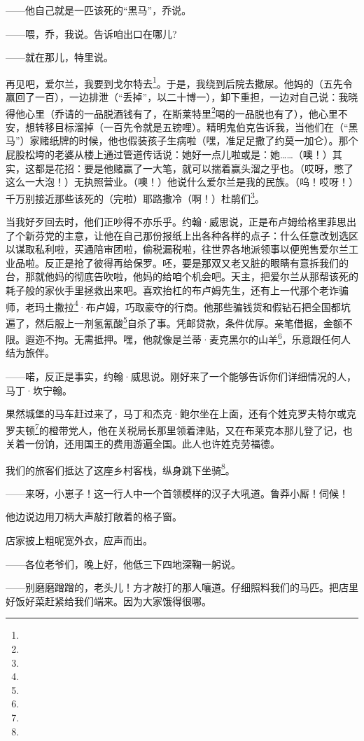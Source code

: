 \par ——他自己就是一匹该死的“黑马”，乔说。
\par ——喂，乔，我说。告诉咱出口在哪儿?
\par ——就在那儿，特里说。
\par 再见吧，爱尔兰，我要到戈尔特去\footnote{}。于是，我绕到后院去撒尿。他妈的（五先令赢回了一百），一边排泄（“丢掉”，以二十博一），卸下重担，一边对自己说：我晓得他心里（乔请的一品脱酒钱有了，在斯莱特里\footnote{}喝的一品脱也有了），他心里不安，想转移目标溜掉（一百先令就是五镑哩）。精明鬼伯克告诉我，当他们在（“黑马”）家赌纸牌的时候，他也假装孩子生病啦（嘿，准足足撒了约莫一加仑）。那个屁股松垮的老婆从楼上通过管道传话说：她好一点儿啦或是：她……（噢！）其实，这都是花招：要是他赌赢了一大笔，就可以揣着赢头溜之乎也。（哎呀，憋了这么一大泡！）无执照营业。（噢！）他说什么爱尔兰是我的民族。（呜！哎呀！）千万别接近那些该死的（完啦）耶路撒冷（啊！）杜鹃们\footnote{}。
\par 当我好歹回去时，他们正吵得不亦乐乎。约翰·威思说，正是布卢姆给格里菲思出了个新芬党的主意，让他在自己那份报纸上出各种各样的点子：什么任意改划选区以谋取私利啦，买通陪审团啦，偷税漏税啦，往世界各地派领事以便兜售爱尔兰工业品啦。反正是抢了彼得再给保罗。呸，要是那双又老又脏的眼睛有意拆我们的台，那就他妈的彻底告吹啦，他妈的给咱个机会吧。天主，把爱尔兰从那帮该死的耗子般的家伙手里拯救出来吧。喜欢抬杠的布卢姆先生，还有上一代那个老诈骗师，老玛土撒拉\footnote{}·布卢姆，巧取豪夺的行商。他那些骗钱货和假钻石把全国都坑遍了，然后服上一剂氢氰酸\footnote{}自杀了事。凭邮贷款，条件优厚。亲笔借据，金额不限。遐迩不拘。无需抵押。嘿，他就像是兰蒂·麦克黑尔的山羊\footnote{}，乐意跟任何人结为旅伴。
\par ——喏，反正是事实，约翰·威思说。刚好来了一个能够告诉你们详细情况的人，马丁·坎宁翰。
\par 果然城堡的马车赶过来了，马丁和杰克·鲍尔坐在上面，还有个姓克罗夫特尔或克罗夫顿\footnote{}的橙带党人，他在关税局长那里领着津贴，又在布莱克本那儿登了记，也关着一份饷，还用国王的费用游遍全国。此人也许姓克劳福德。
\par 我们的旅客们抵达了这座乡村客栈，纵身跳下坐骑\footnote{}。
\par ——来呀，小崽子！这一行人中一个首领模样的汉子大吼道。鲁莽小厮！伺候！
\par 他边说边用刀柄大声敲打敞着的格子窗。
\par 店家披上粗呢宽外衣，应声而出。
\par ——各位老爷们，晚上好，他低三下四地深鞠一躬说。
\par ——别磨磨蹭蹭的，老头儿！方才敲打的那人嚷道。仔细照料我们的马匹。把店里好饭好菜赶紧给我们端来。因为大家饿得很哪。
